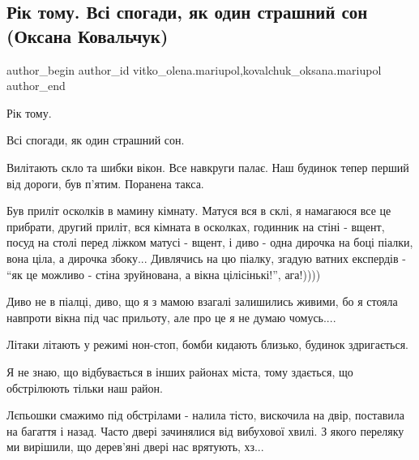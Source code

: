  
 
 
 
 

\subsection{Рік тому. Всі спогади, як один страшний сон (Оксана Ковальчук)}
\label{sec:15_03_2023.fb.vitko_olena.mariupol.1.r_k_tomu__vs__spogad}
 
\ifcmt
 author_begin
   author_id vitko_olena.mariupol,kovalchuk_oksana.mariupol
 author_end
\fi

Рік тому.

Всі спогади, як один страшний сон.

Вилітають скло та шибки вікон. Все навкруги палає. Наш будинок тепер перший від
дороги, був п'ятим. Поранена такса.

Був приліт осколків в мамину кімнату. Матуся вся в склі, я намагаюся все це
прибрати, другий приліт, вся кімната в осколках, годинник на стіні - вщент, посуд
на столі перед ліжком матусі - вщент, і диво - одна дирочка на боці піалки, вона
ціла, а дирочка збоку... Дивлячись на цю піалку, згадую ватних експердів - \enquote{як це
можливо - стіна зруйнована, а вікна цілісінькі!}, ага!))))

Диво не в піалці, диво, що я з мамою взагалі залишились живими, бо я стояла
навпроти вікна під час прильоту, але про це я не думаю чомусь....

Літаки літають у режимі нон-стоп, бомби кидають близько, будинок здригається.

Я не знаю, що відбувається в інших районах міста, тому здається, що обстрілюють
тільки наш район.

Лєпьошки смажимо під обстрілами - налила тісто, вискочила на двір, поставила на
багаття і назад. Часто двері зачинялися від вибухової хвилі. З якого переляку
ми вирішили, що дерев'яні двері нас врятують, хз...

